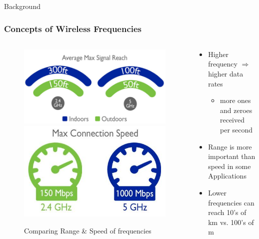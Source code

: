 \documentclass{beamer}
\begin{document}
\begin{frame}{Background}
  \frametitle{Concepts of Wireless Frequencies}
  \begin{columns}
    \begin{column}{0.5\textwidth}
        \begin{figure}[htbp]
          \centering
          \includegraphics[height=.3\textheight]{WiFi-frequency-reach.jpg}
          \includegraphics[height=.3\textheight]{WiFi-frequency-speed.jpg}
          \caption{Comparing Range \& Speed of frequencies \cite{WiFiFreqImOn}}
          \label{fig:WiFi-frequency-speed}
        \end{figure}
    \end{column}
    \begin{column}{0.5\textwidth}
          \begin{itemize}
            \item Higher frequency $\Rightarrow$ higher data rates 
              \begin{itemize}
                \item more ones and zeroes received per second
              \end{itemize}
            \item Range is more important than speed in some Applications
            \item Lower frequencies can reach 10's of km vs. 100's of m
          \end{itemize}
    \end{column}
  \end{columns}
\end{frame}
\end{document}
